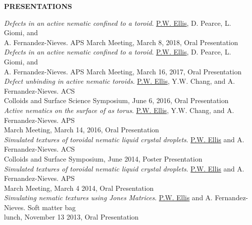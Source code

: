 \documentclass[10pt]{article}
\newenvironment{changemargin}[2]{%
  \list{}{\rightmargin#2\leftmargin#1
    \parsep=0pt\topsep=1pt\partopsep=0pt}
\item[]} {\endlist}
\newenvironment{indentmore}{\begin{changemargin}{10pt}{0cm}}{\end{changemargin}}
\begin{document}
\textbf{\large PRESENTATIONS}
\begin{indentmore}
\emph{Defects in an active nematic confined to a toroid}. \underline{P.W. Ellis}, D. Pearce, L. Giomi, and \\ \hspace*{15pt} A. Fernandez-Nieves. APS March Meeting, March 8, 2018, Oral Presentation\\

\emph{Defects in an active nematic confined to a toroid}. \underline{P.W. Ellis}, D. Pearce, L. Giomi, and \\ \hspace*{15pt} A. Fernandez-Nieves. APS March Meeting, March 16, 2017, Oral Presentation\\

\emph{Defect unbinding in active nematic toroids}. \underline{P.W. Ellis}, Y.W. Chang, and A. Fernandez-Nieves. ACS\\ \hspace*{15pt} Colloids and Surface Science Symposium, June 6, 2016, Oral Presentation\\

\emph{Active nematics on the surface of as torus}. \underline{P.W. Ellis}, Y.W. Chang, and A. Fernandez-Nieves. APS\\ \hspace*{15pt} March Meeting, March 14, 2016, Oral Presentation\\

\emph{Simulated textures of toroidal nematic liquid crystal droplets}. \underline{P.W. Ellis} and A. Fernandez-Nieves. ACS\\ \hspace*{15pt} Colloids and Surface Symposium, June 2014, Poster Presentation\\

\emph{Simulated textures of toroidal nematic liquid crystal droplets}. \underline{P.W. Ellis} and A. Fernandez-Nieves. APS\\ \hspace*{15pt} March Meeting, March 4 2014, Oral Presentation\\

\emph{Simulating nematic textures using Jones Matrices}. \underline{P.W. Ellis} and A. Fernandez-Nieves. Soft matter bag\\ \hspace*{15pt} lunch, November 13 2013, Oral Presentation\\
\end{indentmore}
\end{document}
